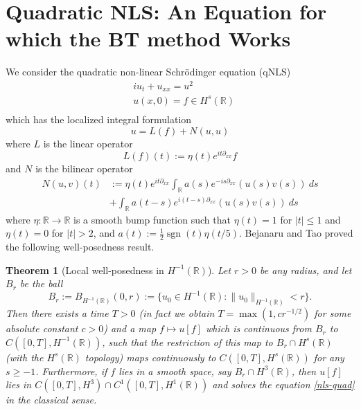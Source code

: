 \documentclass[12pt,reqno]{amsart}
\numberwithin{equation}{section}  %
\newcommand{\rr}{\mathbb{R}}
\newtheorem{theorem}{Theorem}[section]
\def\sgn{\operatorname{sgn}}
\newcommand{\R}{\mathbb{R}}
\begin{document}
%
%
%
%
%
%
%
%
%
%
\section{Quadratic NLS: An Equation for which the BT method Works}
%
  We consider the quadratic non-linear Schr\"odinger equation (qNLS)
\begin{equation}\label{nls-quad}
\begin{split}
& i u_t + u_{xx} = u^2\\
& u(x, 0) = f \in H^s(\R) \\
\end{split}
\end{equation}
which has the localized integral formulation 
\begin{equation}\label{uln-2}
 u = L(f) + N(u,u)
 \end{equation}
where $L$ is the linear operator
\begin{equation}\label{Ldef}
  L(f)(t) := \eta(t) e^{it\partial_{xx}} f
\end{equation}
and $N$ is the bilinear operator
\begin{equation}\label{Ndef}
\begin{split}
N(u,v)(t) &:=
\eta(t) e^{it\partial_{xx}} \int_\R a(s) e^{-is\partial_{xx}}(u(s)v(s))\ ds\\
&+ \int_\R a(t-s) e^{i(t-s)\partial_{xx}}(u(s) v(s))\ ds
\end{split}
\end{equation}
%
where $\eta: \R \to \R$ is a smooth bump function such that $\eta(t) = 1$ for
$|t| \leq 1$ and $\eta(t) = 0$ for $|t| > 2$, and $a(t) := \frac{1}{2}
\sgn(t)\eta(t/5)$.  
%
Bejanaru and Tao proved the following well-posedness result.
\begin{theorem}[Local well-posedness in $H^{-1}(\R)$]\label{lwp}
Let $r > 0$ be any radius, and let $B_r$ be the ball
$$ B_r := B_{H^{-1}(\R)}(0,r) := \{ u_0 \in H^{-1}(\R): \| u_0 \|_{H^{-1}(\R)} < r \}.$$
Then there exists a time $T > 0$ (in fact we obtain $T = \max(1, c r^{-1/2} )$ for some absolute constant $c>0$)
and a map $f \mapsto u[f]$ which is continuous from $B_r$ to $C([0,T],
H^{-1}(\rr))$, such that the
restriction of this map to $B_r \cap H^s(\R)$ (with the $H^s(\R)$ topology) maps continuously 
to $C([0,T], H^s(\rr))$ for any $s \geq -1$.  Furthermore, if $f$ lies in
a smooth space, say $B_r \cap H^3(\R)$, then $u[f]$ lies in $C([0, T], H^3) \cap
C^1([0,T], H^1(\rr))$ and
solves the equation \eqref{nls-quad} in the classical sense.   
\end{theorem}
\end{document}
